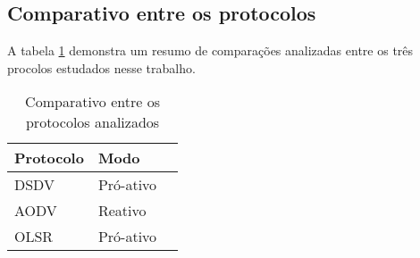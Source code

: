 \subsection{Comparativo entre os protocolos} 
A tabela \ref{tabCompProt} demonstra um resumo de compara\c{c}\~oes analizadas entre os tr\^es procolos estudados nesse trabalho.

\begin{table}[H]
	\centering
	\caption{Comparativo entre os protocolos analizados}
	\begin{tabular}{ | l | l | l | }
		\hline
		Protocolo & Modo \\ \hline
		DSDV & Pr\'o-ativo \\ \hline
		AODV & Reativo \\ \hline
		OLSR & Pr\'o-ativo \\ \hline
	\end{tabular}
	\label{tabCompProt}
\end{table}